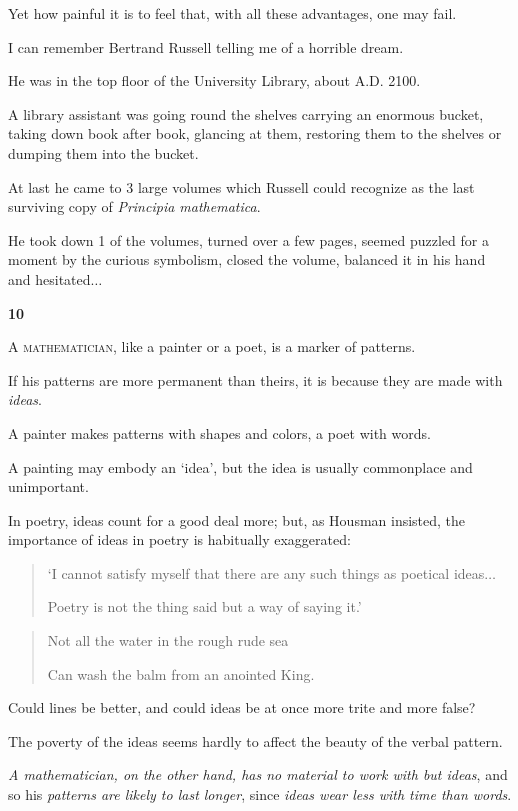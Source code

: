 \documentclass{article}
\numberwithin{equation}{section}
\begin{document}
%
Yet how painful it is to feel that, with all these advantages, one may fail.

I can remember Bertrand Russell telling me of a horrible dream.

He was in the top floor of the University Library, about A.D. 2100.

A library assistant was going round the shelves carrying an enormous bucket, taking down book after book, glancing at them, restoring them to the shelves or dumping them into the bucket.

At last he came to 3 large volumes which Russell could recognize as the last surviving copy of \textit{Principia mathematica}.

He took down 1 of the volumes, turned over a few pages, seemed puzzled for a moment by the curious symbolism, closed the volume, balanced it in his hand and hesitated$\ldots$

\begin{center}
    \large\textbf{10}
\end{center}
\textsc{A mathematician}, like a painter or a poet, is a marker of patterns.

If his patterns are more permanent than theirs, it is because they are made with \textit{ideas}.

A painter makes patterns with shapes and colors, a poet with words.

A painting may embody an `idea', but the idea is usually commonplace and unimportant.

In poetry, ideas count for a good deal more; but, as Housman insisted, the importance of ideas in poetry is habitually exaggerated:
\begin{quotation}
    `I cannot satisfy myself that there are any such things as poetical ideas$\ldots$
    
    Poetry is not the thing said but a way of saying it.'
\end{quotation}

\begin{quotation}
    Not all the water in the rough rude sea
    
    Can wash the balm from an anointed King.
\end{quotation}
Could lines be better, and could ideas be at once more trite and more false?

The poverty of the ideas seems hardly to affect the beauty of the verbal pattern.

\textit{A mathematician, on the other hand, has no material to work with but ideas}, and so his \textit{patterns are likely to last longer}, since \textit{ideas wear less with time than words}.
\end{document}
